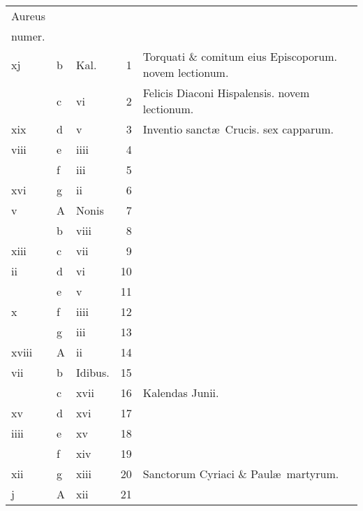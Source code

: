\documentclass[11pt,openany]{book}
\begin{document}
\begin{center}
\begin{tabular}{l | l | l | r | l r}
\color{Red}Aureus & & & & \color{Red} \\
\color{Red}numer. & & & & \color{Red} \\
\color{Red} xj & b & \color{Red} Kal. & 1 & Torquati \& comitum eius Episcoporum. \color{Red} novem lectionum. & \color{Red} \\
\color{Red}  & c & \color{Red} vi & 2 & Felicis Diaconi Hispalensis. \color{Red} novem lectionum. & \color{Red} \\
\color{Red} xix & d & \color{Red} v & 3 & Inventio sanct\ae \ Crucis. \color{Red} sex capparum. & \color{Red} \\
\color{Red} viii & e & \color{Red} iiii & 4 & & \color{Red} \\
\color{Red}  & f & \color{Red} iii & 5 & & \color{Red} \\
\color{Red} xvi & g & \color{Red} ii & 6 & & \color{Red} \\
\color{Red} v & \color{Red} A & Nonis & 7 & & \color{Red} \\
\color{Red}  & b & \color{Red} viii & 8 & & \color{Red} \\
\color{Red} xiii & c & \color{Red} vii & 9 & & \color{Red} \\
\color{Red} ii & d & \color{Red} vi & 10 & & \color{Red} \\
\color{Red}  & e & \color{Red} v & 11 & & \color{Red} \\
\color{Red} x & f & \color{Red} iiii & 12 & & \color{Red} \\
\color{Red}  & g & \color{Red} iii & 13 & & \color{Red} \\
\color{Red} xviii & \color{Red} A & \color{Red} ii & 14 & & \color{Red} \\
\color{Red} vii & b & Idibus. & 15 & & \color{Red} \\
\color{Red}  & c & \color{Red} xvii & 16 & \qquad \color{Red} Kalendas Junii. & \color{Red} \\
\color{Red} xv & d & \color{Red} xvi & 17 & & \color{Red} \\
\color{Red} iiii & e & \color{Red} xv & 18 & & \color{Red} \\
\color{Red}  & f & \color{Red} xiv & 19 & & \color{Red} \\
\color{Red} xii & g & \color{Red} xiii & 20 & Sanctorum Cyriaci \& Paul\ae \ martyrum. & \color{Red} \\
\color{Red} j & \color{Red} A & \color{Red} xii & 21 & & \color{Red} \\

\end{tabular}
\end{center}
\end{document}
